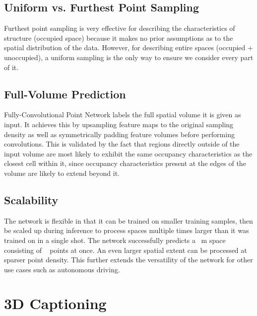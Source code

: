 \documentclass[runningheads]{llncs}
\begin{document}
\subsection{Uniform vs. Furthest Point Sampling}

Furthest point sampling is very effective for describing the characteristics of structure (occupied space) because it makes no prior assumptions as to the spatial distribution of the data. However, for describing entire spaces (occupied + unoccupied), a uniform sampling is the only way to ensure we consider every part of it.





\subsection{Full-Volume Prediction}

Fully-Convolutional Point Network labels the full spatial volume it is given as input. It achieves this by upsampling feature maps to the original sampling density as well as symmetrically padding feature volumes before performing  convolutions. This is validated by the fact that regions directly outside of the input volume are most likely to exhibit the same occupancy characteristics as the closest cell within it, since occupancy characteristics present at the edges of the volume are likely to extend beyond it.

\subsection{Scalability}

The network is flexible in that it can be trained on smaller training samples, then be scaled up during inference to process spaces multiple times larger than it was trained on in a single shot. The network successfully predicts a ~m space consisting of ~ points at once. An even larger spatial extent can be processed at sparser point density. This further extends the versatility of the network for other use cases such as autonomous driving.

\section{3D Captioning}
\label{section:Captioning}
\end{document}
